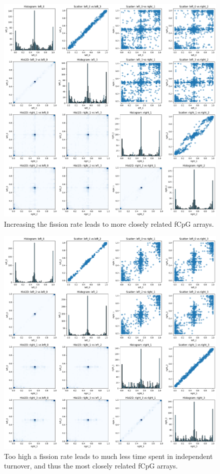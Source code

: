\begin{figure}[h]
    \centering
    \includegraphics[width=\textwidth]{Chapter_4/figures/inter-gland-sens/med-plot.png}
    \caption{Increasing the fission rate leads to more closely related fCpG
    arrays.}
    \label{fig:inter-med}
\end{figure}

\begin{figure}[h]
    \centering
    \includegraphics[width=\textwidth]{Chapter_4/figures/inter-gland-sens/fast-plot.png}
    \caption{Too high a fission rate leads to much less time spent in
    independent turnover, and thus the most closely related fCpG arrays.}
    \label{fig:inter-fast}
\end{figure}


